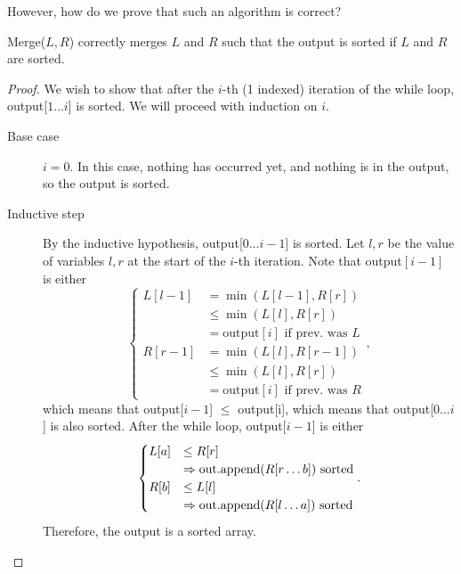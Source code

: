 However, how do we prove that such an algorithm is correct?

\begin{lemma}
	Merge(\( L,R \)) correctly merges \( L \) and \( R \) such that the output is sorted if \( L \) and \( R \) are sorted.
\end{lemma}
\begin{proof}
	We wish to show that after the \( i \)-th (1 indexed) iteration of the while loop, output[\( 1\ldots i \)] is sorted. We will proceed with induction on \( i \).
	\begin{description}
		\item[Base case] \( i = 0 \). In this case, nothing has occurred yet, and nothing is in the output, so the output is sorted.
		\item[Inductive step] By the inductive hypothesis, output[\( 0\ldots i-1 \)] is sorted. Let \( l,r \) be the value of variables \( l,r \) at the start of the \( i \)-th iteration. Note that output\( [i-1]  \) is either\[
				\begin{cases}
					L[l-1] &= \min(L[l-1],R[r]) \\ &\le \min(L[l], R[r]) \\ &= \text{output}[i] \text{ if prev. was } L \\
					R[r-1] &= \min(L[l],R[r-1]) \\ &\le \min(L[l], R[r]) \\ &= \text{output}[i] \text{ if prev. was } R
				\end{cases}
			,\] which means that output[\( i-1 \)] \( \le  \) output[i], which means that output[\( 0\ldots i \)] is also sorted.
			After the while loop, output[\( i-1 \)] is either \[
				\begin{cases}
					L[a] &\le R[r] \\ &\implies \text{out.append(\( R[r\ldots b] \)) sorted} \\
					R[b] &\le L[l] \\ &\implies \text{out.append(\( R[l\ldots a] \)) sorted} \\
				\end{cases}
			.\] Therefore, the output is a sorted array.
	\end{description}
\end{proof}

